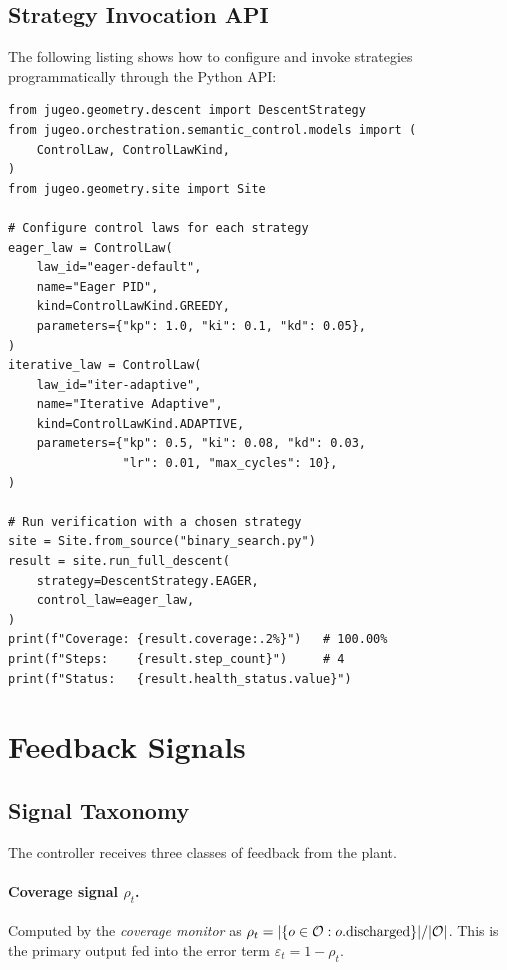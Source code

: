 \documentclass[11pt]{article}
\newcommand{\vcov}{\rho}                   %
\newcommand{\vgap}{\varepsilon}            %
\begin{document}
\subsection{Strategy Invocation API}

The following listing shows how to configure and invoke strategies
programmatically through the \JuGeo{} Python API:

\begin{lstlisting}[style=jugeo-python,
  caption={Configuring and invoking verification strategies.},
  label={lst:strategy_api}]
from jugeo.geometry.descent import DescentStrategy
from jugeo.orchestration.semantic_control.models import (
    ControlLaw, ControlLawKind,
)
from jugeo.geometry.site import Site

# Configure control laws for each strategy
eager_law = ControlLaw(
    law_id="eager-default",
    name="Eager PID",
    kind=ControlLawKind.GREEDY,
    parameters={"kp": 1.0, "ki": 0.1, "kd": 0.05},
)
iterative_law = ControlLaw(
    law_id="iter-adaptive",
    name="Iterative Adaptive",
    kind=ControlLawKind.ADAPTIVE,
    parameters={"kp": 0.5, "ki": 0.08, "kd": 0.03,
                "lr": 0.01, "max_cycles": 10},
)

# Run verification with a chosen strategy
site = Site.from_source("binary_search.py")
result = site.run_full_descent(
    strategy=DescentStrategy.EAGER,
    control_law=eager_law,
)
print(f"Coverage: {result.coverage:.2%}")   # 100.00%
print(f"Steps:    {result.step_count}")     # 4
print(f"Status:   {result.health_status.value}")
\end{lstlisting}

\section{Feedback Signals}
\label{sec:feedback}

\subsection{Signal Taxonomy}

The controller receives three classes of feedback from the plant.

\paragraph{Coverage signal $\vcov_t$.}
Computed by the \emph{coverage monitor} as
$\vcov_t = |\{o \in \oblig : o.\mathrm{discharged}\}| / |\oblig|$.
This is the primary output fed into the error term $\vgap_t = 1 - \vcov_t$.
\end{document}
